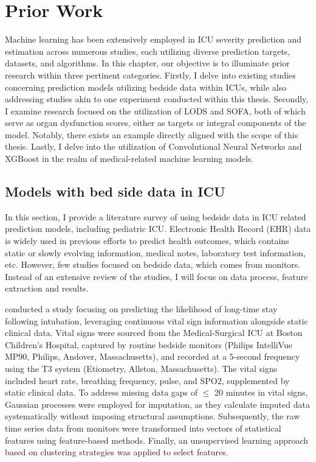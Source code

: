 \documentclass[12pt,a4paper,english
]{tunithesis}
\begin{document}
\chapter{Prior Work}
\label{ch:priorwork}
Machine learning has been extensively employed in ICU severity prediction and estimation across numerous studies, each utilizing diverse prediction targets, datasets, and algorithms. In this chapter, our objective is to illuminate prior research within three pertinent categories. Firstly, I delve into existing studies concerning prediction models utilizing bedside data within ICUs, while also addressing studies akin to one experiment conducted within this thesis. Secondly, I examine research focused on the utilization of LODS and SOFA, both of which serve as organ dysfunction scores, either as targets or integral components of the model. Notably, there exists an example directly aligned with the scope of this thesis. Lastly, I delve into the utilization of Convolutional Neural Networks and XGBoost in the realm of medical-related machine learning models. 

\section{Models with bed side data in ICU}
In this section, I provide a literature survey of using bedside data in ICU related prediction models, including pediatric ICU. Electronic Health Record (EHR) data is widely used in previous efforts to predict health outcomes, which contains static or slowly evolving information, medical notes, laboratory test information, etc. However, few studies focused on bedside data, which comes from monitors. Instead of an extensive review of the studies, I will focus on data process, feature extraction and results.

\textcite{mitdavid2020} conducted a study focusing on predicting the likelihood of long-time stay following intubation, leveraging continuous vital sign information alongside static clinical data. Vital signs were sourced from the Medical-Surgical ICU at Boston Children's Hospital, captured by routine bedside monitors (Philips IntelliVue MP90, Philips, Andover, Massachusetts), and recorded at a 5-second frequency using the T3 system (Etiometry, Allston, Massachusetts). The vital signs included heart rate, breathing frequency, pulse, and SPO2, supplemented by static clinical data. To address missing data gaps of $\leq$ 20 minutes in vital signs, Gaussian processes were employed for imputation, as they calculate imputed data systematically without imposing structural assumptions. Subsequently, the raw time series data from monitors were transformed into vectors of statistical features using feature-based methods. Finally, an unsupervised learning approach based on clustering strategies was applied to select features. 
\end{document}
